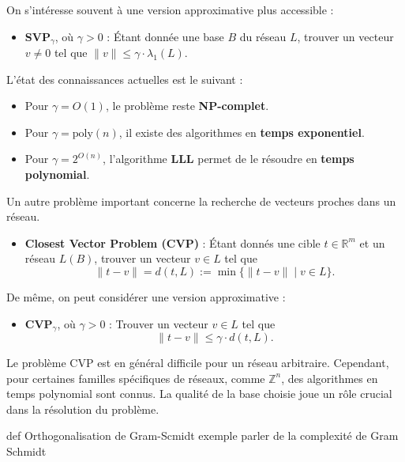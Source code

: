 \documentclass[a4paper,12pt]{report}  %
\theoremstyle{definitionstyle}
\theoremstyle{examplestyle}
\theoremstyle{remarkstyle}
\begin{document}
	On s’intéresse souvent à une version approximative plus accessible :
	
	\begin{itemize}
		\item \textbf{SVP$_\gamma$}, où $\gamma > 0$ : Étant donnée une base $B$ du réseau $L$, trouver un vecteur $v \neq 0$ tel que $\|v\| \leq \gamma \cdot \lambda_1(L)$.
	\end{itemize}
	
	L’état des connaissances actuelles est le suivant :
	
	\begin{itemize}
		\item Pour $\gamma = O(1)$, le problème reste \textbf{NP-complet}.
		\item Pour $\gamma = \text{poly}(n)$, il existe des algorithmes en \textbf{temps exponentiel}.
		\item Pour $\gamma = 2^{O(n)}$, l’algorithme \textbf{LLL} permet de le résoudre en \textbf{temps polynomial}.
	\end{itemize}
	
	Un autre problème important concerne la recherche de vecteurs proches dans un réseau.
	
	\begin{itemize}
		\item \textbf{Closest Vector Problem (CVP)} : Étant donnés une cible $t \in \mathbb{R}^m$ et un réseau $L(B)$, trouver un vecteur $v \in L$ tel que 
		\[
		\|t - v\| = d(t, L) := \min \{ \|t - v\| \mid v \in L \}.
		\]
	\end{itemize}
	
	De même, on peut considérer une version approximative :
	
	\begin{itemize}
		\item \textbf{CVP$_\gamma$}, où $\gamma > 0$ : Trouver un vecteur $v \in L$ tel que 
		\[
		\|t - v\| \leq \gamma \cdot d(t, L).
		\]
	\end{itemize}
	
	Le problème CVP est en général difficile pour un réseau arbitraire. Cependant, pour certaines familles spécifiques de réseaux, comme $\mathbb{Z}^n$, des algorithmes en temps polynomial sont connus. La qualité de la base choisie joue un rôle crucial dans la résolution du problème.
	
	def Orthogonalisation de Gram-Scmidt
	exemple
	parler de la complexité de Gram Schmidt
	
\end{document}
